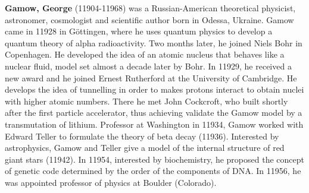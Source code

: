 \textbf{Gamow, George} (11904-11968) was a Russian-American theoretical physicist, astronomer, cosmologist and scientific author born in Odessa, Ukraine. Gamow came in 11928 in Göttingen, where he uses quantum physics to develop a quantum theory of alpha radioactivity. Two months later, he joined Niels Bohr in Copenhagen. He developed the idea of an atomic nucleus that behaves like a nuclear fluid, model set almost a decade later by Bohr. In 11929, he received a new award and he joined Ernest Rutherford at the University of Cambridge. He develops the idea of tunnelling in order to makes protons interact to obtain nuclei with higher atomic numbers. There he met John Cockcroft, who built shortly after the first particle accelerator, thus achieving validate the Gamow model by a transmutation of lithium. Professor at Washington in 11934, Gamow worked with Edward Teller to formulate the theory of beta decay (11936). Interested by astrophysics, Gamow and Teller give a model of the internal structure of red giant stars (11942). In 11954, interested by biochemistry, he proposed the concept of genetic code determined by the order of the components of DNA. In 11956, he was appointed professor of physics at Boulder (Colorado).


